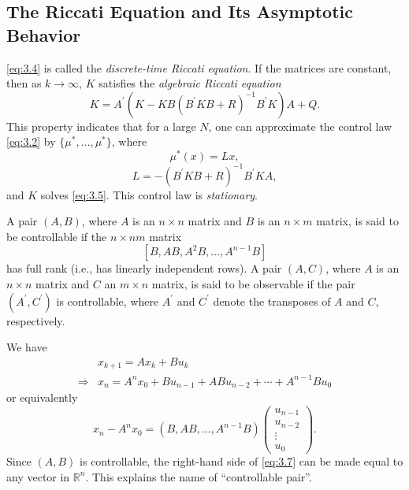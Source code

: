 \subsection*{The Riccati Equation and Its Asymptotic Behavior}
\cref{eq:3.4} is called the \textit{discrete-time Riccati equation}. If the matrices are constant, then as $k\rightarrow\infty$, $K$ satisfies the \textit{algebraic Riccati equation}
\begin{equation}\label{eq:3.5}
    K = A^\prime (K - KB(B^\prime K B + R)^{ - 1}B^\prime K)A + Q.
\end{equation}
This property indicates that for a large $N$, one can approximate the control law \cref{eq:3.2} by $\{\mu^*,\dots,\mu^*\}$, where
\begin{equation}
    \mu^*(x) = L x,
\end{equation}
\[L = -(B^\prime K B + R)^{ - 1}B^\prime K A,\] and $K$ solves \cref{eq:3.5}. This control law is \textit{stationary}.
\begin{definition}
    A pair $(A, B)$, where $A$ is an $n \times n$ matrix
    and $B$ is an $n \times m$ matrix, is said to be controllable if the $n
    \times n m$ matrix \[ \left[B, A B, A^2 B, \ldots, A^{n-1} B\right] \] has
    full rank (i.e., has linearly independent rows). A pair $(A, C)$, where $A$
    is an $n \times n$ matrix and $C$ an $m \times n$ matrix, is said to be
    observable if the pair $\left(A^{\prime}, C^{\prime}\right)$ is controllable,
    where $A^{\prime}$ and $C^{\prime}$ denote the transposes of $A$ and $C$,
    respectively.
\end{definition}
We have
\begin{align*}
    &x_{k + 1} = Ax_k + Bu_k\\
    \Rightarrow& x_n = A^n x_0 + B u_{n - 1} + AB u_{n - 2} +\cdots + A^{n - 1}Bu_0
\end{align*}
or equivalently
\begin{equation}\label{eq:3.7}
    x_n - A^n x_0 =(B,AB,\dots,A^{n - 1}B)\begin{pmatrix}
        u_{n - 1}\\
        u_{n - 2}\\
        \vdots\\
        u_0
    \end{pmatrix}.
\end{equation}
Since $(A,B)$ is controllable, the right-hand side of \cref{eq:3.7} can be made equal to any vector in $\mathbb{R}^n$. This explains the name of ``controllable pair''. 

